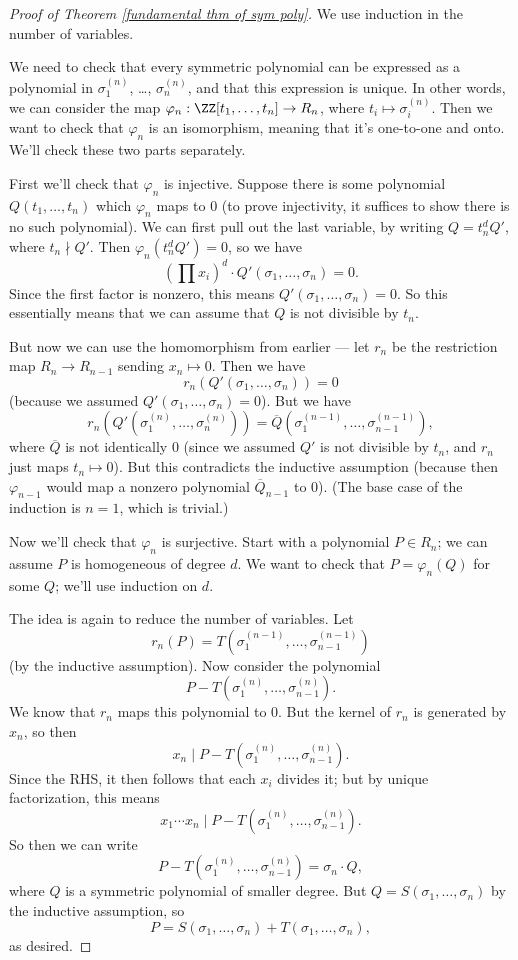 \begin{proof}[Proof of Theorem \ref{fundamental thm of sym poly}]
    We use induction in the number of variables. 
    
    We need to check that every symmetric polynomial can be expressed as a polynomial in $\sigma_1^{(n)}$, \ldots, $\sigma_n^{(n)}$, and that this expression is unique. In other words, we can consider the map $\varphi_n : \ZZ[t_1, \ldots, t_n] \to R_n$, where $t_i \mapsto \sigma_i^{(n)}$. Then we want to check that $\varphi_n$ is an isomorphism, meaning that it's one-to-one and onto. We'll check these two parts separately. 

    First we'll check that $\varphi_n$ is injective. Suppose there is some polynomial $Q(t_1, \ldots, t_n)$ which $\varphi_n$ maps to $0$ (to prove injectivity, it suffices to show there is no such polynomial). We can first pull out the last variable, by writing $Q = t_n^dQ'$, where $t_n \nmid Q'$. Then $\varphi_n(t_n^dQ') = 0$, so we have \[\left(\prod x_i\right)^d\cdot Q'(\sigma_1, \ldots, \sigma_n) = 0.\] Since the first factor is nonzero, this means $Q'(\sigma_1, \ldots, \sigma_n) = 0$. So this essentially means that we can assume that $Q$ is not divisible by $t_n$. 
    
    But now we can use the homomorphism from earlier --- let $r_n$ be the restriction map $R_n \to R_{n - 1}$ sending $x_n \mapsto 0$. Then we have \[r_n(Q'(\sigma_1, \ldots, \sigma_n)) = 0\] (because we assumed $Q'(\sigma_1, \ldots, \sigma_n) = 0$). But we have \[r_n\left(Q'\left(\sigma_1^{(n)}, \ldots, \sigma_n^{(n)}\right)\right) = \overline{Q}\left(\sigma_1^{(n - 1)}, \ldots, \sigma_{n - 1}^{(n - 1)}\right),\] where $\overline{Q}$ is not identically $0$ (since we assumed $Q'$ is not divisible by $t_n$, and $r_n$ just maps $t_n \mapsto 0$). But this contradicts the inductive assumption (because then $\varphi_{n - 1}$ would map a nonzero polynomial $\overline{Q}_{n - 1}$ to $0$). (The base case of the induction is $n = 1$, which is trivial.)
    
    Now we'll check that $\varphi_n$ is surjective. Start with a polynomial $P \in R_n$; we can assume $P$ is homogeneous of degree $d$. We want to check that $P = \varphi_n(Q)$ for some $Q$; we'll use induction on $d$. 
    
    The idea is again to reduce the number of variables. Let \[r_n(P) = T(\sigma_1^{(n - 1)}, \ldots, \sigma_{n - 1}^{(n - 1)})\] (by the inductive assumption). Now consider the polynomial \[P - T\left(\sigma_1^{(n)}, \ldots, \sigma_{n - 1}^{(n)}\right).\] We know that $r_n$ maps this polynomial to $0$. But the kernel of $r_n$ is generated by $x_n$, so then \[x_n \mid P - T\left(\sigma_1^{(n)}, \ldots, \sigma_{n - 1}^{(n)}\right).\] Since the RHS, it then follows that each $x_i$ divides it; but by unique factorization, this means \[x_1\cdots x_n \mid P - T\left(\sigma_1^{(n)}, \ldots, \sigma_{n - 1}^{(n)}\right).\] So then we can write \[P - T\left(\sigma_1^{(n)}, \ldots, \sigma_{n - 1}^{(n)}\right) = \sigma_n\cdot Q,\] where $Q$ is a symmetric polynomial of smaller degree. But $Q = S(\sigma_1, \ldots, \sigma_n)$ by the inductive assumption, so \[P = S(\sigma_1, \ldots, \sigma_n) + T(\sigma_1, \ldots, \sigma_n),\] as desired. 
\end{proof}

